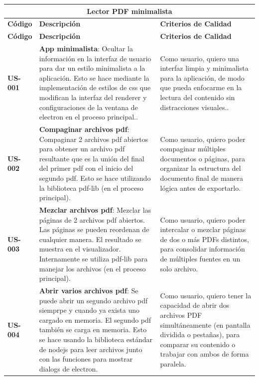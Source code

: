 \begin{longtable}{|l||p{7cm}|p{4.5cm}|}

\multicolumn{3}{c}{Lector PDF minimalista}\\
\hline
\textbf{Código} & \textbf{Descripción} & \textbf{Criterios de Calidad}\\
\hline\hline
\endfirsthead
\hline
\textbf{Código} & \textbf{Descripción} & \textbf{Criterios de Calidad}\\
\hline\hline
\endhead

\textbf{US-001} & \textbf{App minimalista}: Ocultar la información en la interfaz de usuario para dar un estilo minimalista a la aplicación. Esto se hace mediante la implementación de estilos de css que modifican la interfaz del renderer y configuraciones de la ventana de electron en el proceso principal..& Como usuario, quiero una interfaz limpia y minimalista para la aplicación, de modo que pueda enfocarme en la lectura del contenido sin distracciones visuales..\\
\hline
\textbf{US-002} & \textbf{Compaginar archivos pdf}: Compaginar 2 archivos pdf abiertos para obtener un archivo pdf resultante que es la unión del final del primer pdf con el inicio del segundo pdf. Esto se hace utilizando la biblioteca pdf-lib (en el proceso principal).  & Como usuario, quiero poder compaginar múltiples documentos o páginas, para organizar la estructura del documento final de manera lógica antes de exportarlo.\\
\hline
\textbf{US-003} & \textbf{Mezclar archivos pdf}: Mezclar las páginas de 2 archivos pdf abiertos. Las páginas se pueden reordenan de cualquier manera. El resultado se muestra en el visualizador. Internamente se utiliza pdf-lib para manejar los archivos (en el proceso principal). & Como usuario, quiero poder intercalar o mezclar páginas de dos o más PDFs distintos, para consolidar información de múltiples fuentes en un solo archivo.\\
\hline
\textbf{US-004} & \textbf{Abrir varios archivos pdf}: Se puede abrir un segundo archivo pdf siemprpe y cuando ya exista uno cargado en memoria. El segundo pdf también se carga en memoria. Esto se hace usando la biblioteca estándar de nodejs para leer archivos junto con las funciones para mostrar dialogs de electron.  & Como usuario, quiero tener la capacidad de abrir dos archivos PDF simultáneamente (en pantalla dividida o pestañas), para comparar su contenido o trabajar con ambos de forma paralela.\\

\end{longtable}
